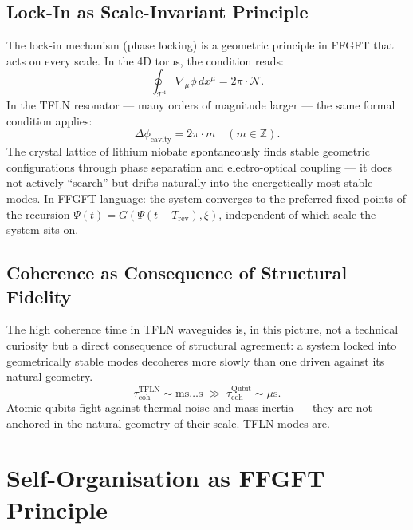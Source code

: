 \subsection{Lock-In as Scale-Invariant Principle}

The lock-in mechanism (phase locking) is a geometric principle in FFGFT
that acts on every scale. In the 4D torus, the condition reads:
\begin{equation}
  \oint_{\mathcal{T}^4} \nabla_{\mu}\phi\,dx^\mu = 2\pi\cdot\mathcal{N}.
\end{equation}
In the TFLN resonator — many orders of magnitude larger — the same
formal condition applies:
\begin{equation}
  \Delta\phi_{\text{cavity}} = 2\pi\cdot m \quad (m \in \mathbb{Z}).
\end{equation}
The crystal lattice of lithium niobate spontaneously finds stable
geometric configurations through phase separation and electro-optical
coupling — it does not actively ``search'' but drifts naturally into
the energetically most stable modes. In FFGFT language: the system
converges to the preferred fixed points of the recursion
$\Psi(t) = G(\Psi(t-T_{\text{rev}}), \xi)$,
independent of which scale the system sits on.

\subsection{Coherence as Consequence of Structural Fidelity}

The high coherence time in TFLN waveguides is, in this picture, not
a technical curiosity but a direct consequence of structural agreement:
a system locked into geometrically stable modes decoheres more slowly
than one driven against its natural geometry.
\begin{equation}
  \tau_{\text{coh}}^{\text{TFLN}} \sim \text{ms}\ldots\text{s}
  \;\gg\;
  \tau_{\text{coh}}^{\text{Qubit}} \sim \mu\text{s}.
\end{equation}
Atomic qubits fight against thermal noise and mass inertia — they are
not anchored in the natural geometry of their scale. TFLN modes are.

\section{Self-Organisation as FFGFT Principle}

